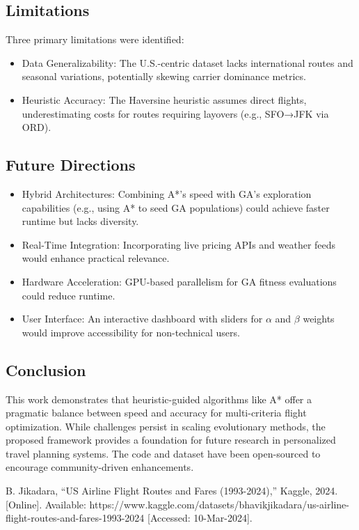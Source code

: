 \documentclass[conference]{IEEEtran}
\begin{document}
\subsection{Limitations}
Three primary limitations were identified:  
\begin{itemize}
    \item Data Generalizability: The U.S.-centric dataset lacks international routes and seasonal variations, potentially skewing carrier dominance metrics.  
    \item Heuristic Accuracy: The Haversine heuristic assumes direct flights, underestimating costs for routes requiring layovers (e.g., SFO→JFK via ORD).  
\end{itemize}

\subsection{Future Directions}
\begin{itemize}
    \item Hybrid Architectures: Combining A*’s speed with GA’s exploration capabilities (e.g., using A* to seed GA populations) could achieve faster runtime but lacks diversity.  
    \item Real-Time Integration: Incorporating live pricing APIs and weather feeds would enhance practical relevance.  
    \item Hardware Acceleration: GPU-based parallelism for GA fitness evaluations could reduce runtime.  
    \item User Interface: An interactive dashboard with sliders for $\alpha$ and $\beta$ weights would improve accessibility for non-technical users.  
\end{itemize}

\subsection{Conclusion}
This work demonstrates that heuristic-guided algorithms like A* offer a pragmatic balance between speed and accuracy for multi-criteria flight optimization.
 While challenges persist in scaling evolutionary methods, the proposed framework provides a foundation for future research in personalized travel planning systems. 
 The code and dataset have been open-sourced to encourage community-driven enhancements.

\balance %

\begin{thebibliography}{9}
     B. Jikadara, ``US Airline Flight Routes and Fares (1993-2024),'' Kaggle, 2024. [Online]. Available: 
    https://www.kaggle.com/datasets/bhavikjikadara/us-airline-flight-routes-and-fares-1993-2024 [Accessed: 10-Mar-2024].
    
\end{thebibliography}
\end{document}
